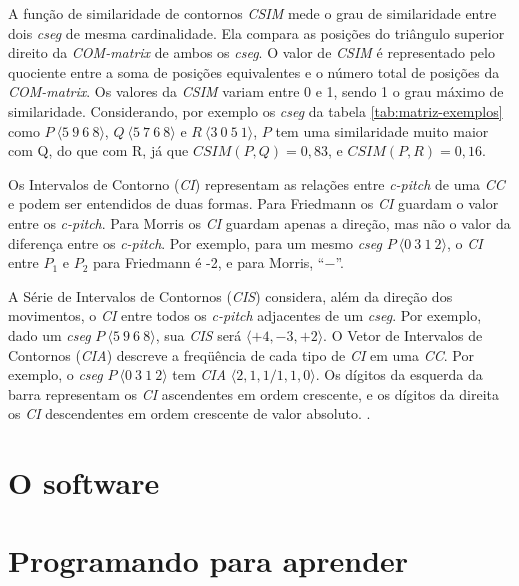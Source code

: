 \documentclass[brazil]{article}
\newcommand{\termo}[1]{\textit{#1}}
\begin{document}
A função de similaridade de contornos \termo{CSIM} mede o grau de
similaridade entre dois \termo{cseg} de mesma cardinalidade. Ela
compara as posições do triângulo superior direito da
\termo{COM-matrix} de ambos os \termo{cseg}. O valor de \termo{CSIM} é
representado pelo quociente entre a soma de posições equivalentes e o
número total de posições da \termo{COM-matrix}. Os valores da
\termo{CSIM} variam entre 0 e 1, sendo 1 o grau máximo de
similaridade. Considerando, por exemplo os \termo{cseg} da tabela
\ref{tab:matriz-exemplos} como $P\:\langle5\:9\:6\:8\rangle$,
$Q\:\langle5\:7\:6\:8\rangle$ e $R\:\langle3\:0\:5\:1\rangle$, $P$ tem
uma similaridade muito maior com Q, do que com R, já que
$CSIM(P,Q)=0,83$, e $CSIM(P,R)=0,16$.

Os Intervalos de Contorno (\termo{CI}) representam as relações entre
\termo{c-pitch} de uma \termo{CC} e podem ser entendidos de duas
formas. Para Friedmann \cite{friedmann85:methodology} os \termo{CI}
guardam o valor entre os \termo{c-pitch}. Para Morris
\cite{morris93:directions} os \termo{CI} guardam apenas a direção, mas
não o valor da diferença entre os \termo{c-pitch}. Por exemplo, para
um mesmo \termo{cseg} $P\:\langle0\:3\:1\:2\rangle$, o \termo{CI}
entre $P_1$ e $P_2$ para Friedmann é -2, e para Morris, ``$-$''.

A Série de Intervalos de Contornos (\termo{CIS}) considera, além da
direção dos movimentos, o \termo{CI} entre todos os \termo{c-pitch}
adjacentes de um \termo{cseg}. Por exemplo, dado um \termo{cseg}
$P\:\langle5\:9\:6\:8\rangle$, sua \termo{CIS} será
$\langle+4,-3,+2\rangle$. O Vetor de Intervalos de Contornos
(\termo{CIA}) descreve a freqüência de cada tipo de \termo{CI} em uma
\termo{CC}. Por exemplo, o \termo{cseg} $P\:\langle0\:3\:1\:2\rangle$
tem \termo{CIA} $\langle2,1,1/1,1,0\rangle$. Os dígitos da esquerda da
barra representam os \termo{CI} ascendentes em ordem crescente, e os
dígitos da direita os \termo{CI} descendentes em ordem crescente de
valor absoluto. \cite{friedmann85:methodology}.

\section{O software}
\label{sec:o-software}

\section{Programando para aprender}
\label{sec:progr-para-aprend}
\end{document}
